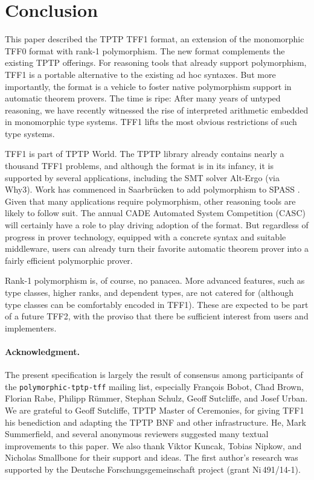 \section{Conclusion}
\label{sec_concl}

This paper described the TPTP TFF1 format, an extension of the monomorphic TFF0 format
with rank-1 polymorphism. The new format complements the existing TPTP
offerings. %
For reasoning tools that already
support polymorphism, TFF1 is a portable alternative to the existing ad hoc
syntaxes. But more importantly, the format is a vehicle to foster native
polymorphism support in automatic theorem provers. The time is ripe: After many
years of untyped reasoning, we have recently witnessed the rise of
interpreted arithmetic embedded in monomorphic type systems. TFF1
lifts the most obvious restrictions of such type systems.

TFF1 is part of TPTP World. The TPTP library already contains
nearly a thousand TFF1 problems, and although the format is in its
infancy, it is supported by several applications, including the SMT solver
Alt-Ergo (via Why3).
Work has commenced in Saarbr\"ucken to add polymorphism to SPASS \cite{wand-weidenbach-2012}.
Given that many applications require polymorphism, other reasoning tools are
likely to follow suit.
The annual CADE Automated System Competition (CASC) will certainly have a
role to play driving adoption of the format. But regardless of progress in
prover technology, equipped with a concrete syntax and suitable middleware,
users can already turn their favorite automatic theorem prover into a
fairly efficient polymorphic prover.

Rank-1 polymorphism is, of course, no panacea. More advanced features, such as
type classes, higher ranks, and dependent types, are not catered for (although type
classes can be comfortably encoded in TFF1). These are expected to be
part of a future TFF2, with the proviso that there be sufficient interest from
users and implementers.

\def\ackname{Acknowledgment}
\paragraph{\textbf{\upshape\ackname.}}
%
The present specification is largely the result of consensus among
participants of the {\tt polymorphic-tptp-tff} mailing list, especially
Fran\c{c}ois Bobot, Chad Brown, Florian Rabe, Philipp R\"ummer, Stephan Schulz,
Geoff Sutcliffe, and Josef Urban.
We are grateful to Geoff Sutcliffe, TPTP Master of Ceremonies, for giving TFF1
his benediction and adapting the TPTP BNF and other infrastructure.
He, Mark Summerfield, and several anonymous reviewers suggested many textual
improvements to this paper. We also thank Viktor Kuncak, Tobias Nipkow, and
Nicholas Smallbone for their support and ideas.
%
The first author's research was supported by the Deutsche
Forschungs\-gemein\-schaft project  (grant
Ni\,491\slash 14-1).
%
